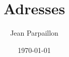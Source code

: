 \documentclass[a5paper,11pt,twoside]{report}
\begin{document}
\title{Adresses}
\author{Jean Parpaillon}

\date{\today}

\maketitle

\nodir{*}
\end{document}
